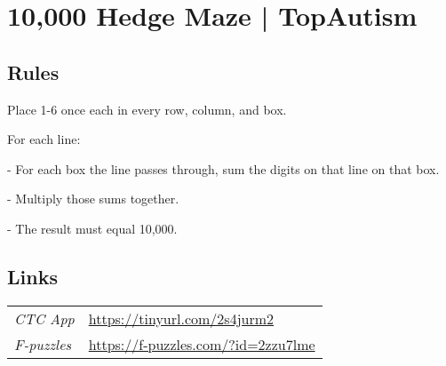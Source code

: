\section{10,000 Hedge Maze | {\normalfont TopAutism}}
\label{sec:52-10000-hedge-maze-topautism}

\subsection*{Rules}
\begin{markdown}
Place 1-6 once each in every row, column, and box.

For each line:

- For each box the line passes through, sum the digits on that line on that box.

- Multiply those sums together.

- The result must equal 10,000.
\end{markdown}
\subsection*{Links}
\begin{tabularx}{\textwidth}{l X}
\emph{CTC App} & \url{https://tinyurl.com/2s4jurm2} \\
\emph{F-puzzles} & \url{https://f-puzzles.com/?id=2zzu7lme} \\
\end{tabularx}
\pagebreak
